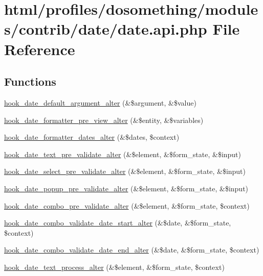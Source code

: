 \hypertarget{date_8api_8php}{
\section{html/profiles/dosomething/modules/contrib/date/date.api.php File Reference}
\label{date_8api_8php}
}
\subsection*{Functions}
\begin{DoxyCompactItemize}
\item 
\hyperlink{date_8api_8php_a78d7487f22190596ae8d3298ae5426c2}{hook\_\-date\_\-default\_\-argument\_\-alter} (\&\$argument, \&\$value)
\item 
\hyperlink{date_8api_8php_a224b13fafa75d248a1d2b33d1c1f409e}{hook\_\-date\_\-formatter\_\-pre\_\-view\_\-alter} (\&\$entity, \&\$variables)
\item 
\hyperlink{date_8api_8php_aae52e9a3c4d3926f92ace9b0ec0041f4}{hook\_\-date\_\-formatter\_\-dates\_\-alter} (\&\$dates, \$context)
\item 
\hyperlink{date_8api_8php_a2fc6fc0b5b0092304084ce3ce29741ae}{hook\_\-date\_\-text\_\-pre\_\-validate\_\-alter} (\&\$element, \&\$form\_\-state, \&\$input)
\item 
\hyperlink{date_8api_8php_a8fa3364916ca73163501f3b9fa319dd6}{hook\_\-date\_\-select\_\-pre\_\-validate\_\-alter} (\&\$element, \&\$form\_\-state, \&\$input)
\item 
\hyperlink{date_8api_8php_ae85363c63f938c6742a67b315e925730}{hook\_\-date\_\-popup\_\-pre\_\-validate\_\-alter} (\&\$element, \&\$form\_\-state, \&\$input)
\item 
\hyperlink{date_8api_8php_acb65970e9f533601f60f43e490e85356}{hook\_\-date\_\-combo\_\-pre\_\-validate\_\-alter} (\&\$element, \&\$form\_\-state, \$context)
\item 
\hyperlink{date_8api_8php_a1a8f0f571d13297a9882ec71a9196692}{hook\_\-date\_\-combo\_\-validate\_\-date\_\-start\_\-alter} (\&\$date, \&\$form\_\-state, \$context)
\item 
\hyperlink{date_8api_8php_ae400f94244ac446f9682e71a57b14f9b}{hook\_\-date\_\-combo\_\-validate\_\-date\_\-end\_\-alter} (\&\$date, \&\$form\_\-state, \$context)
\item 
\hyperlink{date_8api_8php_ac8d820dc0acb6675634de00189114786}{hook\_\-date\_\-text\_\-process\_\-alter} (\&\$element, \&\$form\_\-state, \$context)

\end{DoxyCompactItemize}
